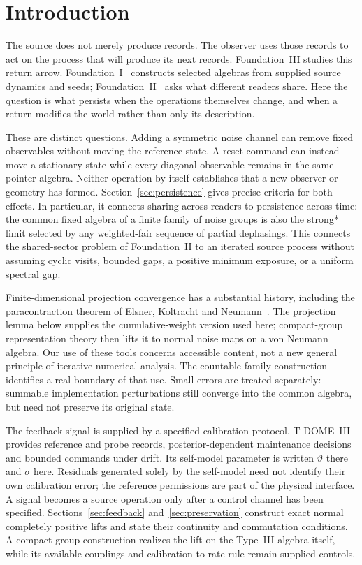 \documentclass[12pt]{article}
\theoremstyle{definition}
\theoremstyle{remark}
\begin{document}
\clearpage
\tableofcontents
\clearpage

\section{Introduction}\label{sec:intro}

The source does not merely produce records. The observer uses those
records to act on the process that will produce its next records.
Foundation~III studies this return arrow. Foundation~I~\cite{FoundationI}
constructs selected algebras from supplied source dynamics and seeds;
Foundation~II~\cite{FoundationII} asks what different readers share.
Here the question is what persists when the operations themselves change,
and when a return modifies the world rather than only its description.

These are distinct questions. Adding a symmetric noise channel can
remove fixed observables without moving the reference state. A reset
command can instead move a stationary state while every diagonal
observable remains in the same pointer algebra. Neither operation by
itself establishes that a new observer or geometry has formed.
Section~\ref{sec:persistence} gives precise criteria for both effects.
In particular, it connects sharing across readers to persistence across
time: the common fixed algebra of a finite family of noise groups is
also the strong* limit selected by any weighted-fair sequence of partial
dephasings. This connects the shared-sector problem of Foundation~II
to an iterated source process without assuming cyclic visits, bounded
gaps, a positive minimum exposure, or a uniform spectral gap.

Finite-dimensional projection convergence has a substantial history,
including the paracontraction theorem of
Elsner, Koltracht and Neumann~\cite{Elsner1992}. The projection lemma
below supplies the cumulative-weight version used here; compact-group
representation theory then lifts it to normal noise maps on a von
Neumann algebra. Our use of these tools concerns accessible content,
not a new general principle of iterative numerical analysis. The
countable-family construction identifies a real boundary of that use.
Small errors are treated separately: summable implementation
perturbations still converge into the common algebra, but need not
preserve its original state.

The feedback signal is supplied by a specified calibration protocol.
T-DOME~III~\cite{TDOMEIII} provides reference and probe records,
posterior-dependent maintenance decisions and bounded commands under
drift. Its self-model parameter is written \(\vartheta\) there and
\(\sigma\) here. Residuals generated solely by the self-model need not
identify their own calibration error; the reference permissions are
part of the physical interface. A signal becomes a source operation
only after a control channel has been specified.
Sections~\ref{sec:feedback} and~\ref{sec:preservation} construct exact
normal completely positive lifts and state their continuity and
commutation conditions. A compact-group construction realizes the lift
on the Type~III algebra itself, while its available couplings and
calibration-to-rate rule remain supplied controls.
\end{document}
